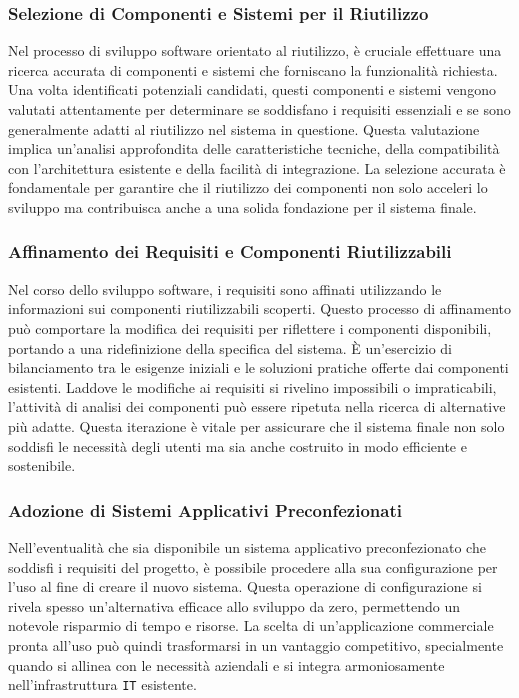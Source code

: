 \subsubsection{Selezione di Componenti e Sistemi per il Riutilizzo}
Nel processo di sviluppo software orientato al riutilizzo, è cruciale effettuare
una ricerca accurata di componenti e sistemi che forniscano la funzionalità
richiesta. Una volta identificati potenziali candidati, questi componenti e
sistemi vengono valutati attentamente per determinare se soddisfano i requisiti
essenziali e se sono generalmente adatti al riutilizzo nel sistema in questione.
Questa valutazione implica un'analisi approfondita delle caratteristiche tecniche,
della compatibilità con l'architettura esistente e della facilità di integrazione.
La selezione accurata è fondamentale per garantire che il riutilizzo dei componenti
non solo acceleri lo sviluppo ma contribuisca anche a una solida fondazione per il
sistema finale.
\subsubsection{Affinamento dei Requisiti e Componenti Riutilizzabili}
Nel corso dello sviluppo software, i requisiti sono affinati utilizzando le
informazioni sui componenti riutilizzabili scoperti. Questo processo di affinamento
può comportare la modifica dei requisiti per riflettere i componenti disponibili,
portando a una ridefinizione della specifica del sistema. È un'esercizio di
bilanciamento tra le esigenze iniziali e le soluzioni pratiche offerte dai
componenti esistenti. Laddove le modifiche ai requisiti si rivelino impossibili
o impraticabili, l'attività di analisi dei componenti può essere ripetuta nella
ricerca di alternative più adatte. Questa iterazione è vitale per assicurare che
il sistema finale non solo soddisfi le necessità degli utenti ma sia anche
costruito in modo efficiente e sostenibile.
\subsubsection{Adozione di Sistemi Applicativi Preconfezionati}
Nell'eventualità che sia disponibile un sistema applicativo preconfezionato
che soddisfi i requisiti del progetto, è possibile procedere alla sua configurazione
per l'uso al fine di creare il nuovo sistema. Questa operazione di configurazione si
rivela spesso un'alternativa efficace allo sviluppo da zero, permettendo un notevole
risparmio di tempo e risorse. La scelta di un'applicazione commerciale pronta all'uso
può quindi trasformarsi in un vantaggio competitivo, specialmente quando si allinea
con le necessità aziendali e si integra armoniosamente nell'infrastruttura \texttt{IT}
esistente.
